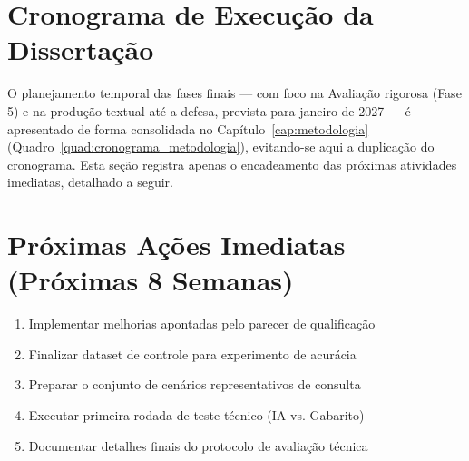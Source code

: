 \section{Cronograma de Execução da Dissertação}

O planejamento temporal das fases finais --- com foco na Avaliação rigorosa (Fase 5) e na produção textual até a defesa, prevista para janeiro de 2027 --- é apresentado de forma consolidada no Capítulo~\ref{cap:metodologia} (Quadro~\ref{quad:cronograma_metodologia}), evitando-se aqui a duplicação do cronograma. Esta seção registra apenas o encadeamento das próximas atividades imediatas, detalhado a seguir.

\section{Próximas Ações Imediatas (Próximas 8 Semanas)}

\begin{enumerate}
    \item Implementar melhorias apontadas pelo parecer de qualificação
    \item Finalizar dataset de controle para experimento de acurácia
    \item Preparar o conjunto de cenários representativos de consulta
    \item Executar primeira rodada de teste técnico (IA vs. Gabarito)
    \item Documentar detalhes finais do protocolo de avaliação técnica
\end{enumerate}
